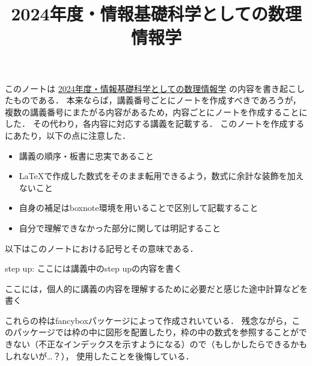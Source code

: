\documentclass{ltjsarticle}
\title{
    2024年度・情報基礎科学としての数理情報学\\
}
\begin{document}
\maketitle
このノートは
\href{https://youtube.com/playlist?list=PLsBJ3psEqyr_iFJnQjCNiuC3lVkqBoYfb&si=KQG1wQ-sp0awci4k}{2024年度・情報基礎科学としての数理情報学}
の内容を書き起こしたものである．
本来ならば，講義番号ごとにノートを作成すべきであろうが，
複数の講義番号にまたがる内容があるため，内容ごとにノートを作成することにした．
その代わり，各内容に対応する講義を記載する．
このノートを作成するにあたり，以下の点に注意した．
\begin{itemize}
    \item 講義の順序・板書に忠実であること
    \item \LaTeX で作成した数式をそのまま転用できるよう，数式に余計な装飾を加えないこと
    \item 自身の補足はboxnote環境を用いることで区別して記載すること
    \item 自分で理解できなかった部分に関しては明記すること
\end{itemize}

以下はこのノートにおける記号とその意味である．
\begin{itembox}[l]{step up:}
    ここには講義中のstep upの内容を書く
\end{itembox}

\begin{boxnote}
    ここには，個人的に講義の内容を理解するために必要だと感じた途中計算などを書く
\end{boxnote}

これらの枠はfancyboxパッケージによって作成されいている．
残念ながら，このパッケージでは枠の中に図形を配置したり，枠の中の数式を参照することができない（不正なインデックスを示すようになる）ので（もしかしたらできるかもしれないが…？），
使用したことを後悔している．

\newpage

\tableofcontents

\newpage

% 





\end{document}
